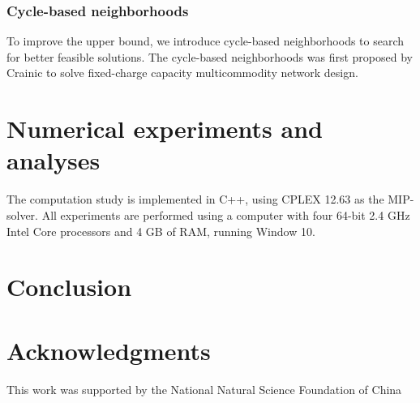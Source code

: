 \documentclass[11pt,nonblindrev,fleqn]{article}
\begin{document}
\subsubsection{Cycle-based neighborhoods}
To improve the upper bound, we introduce cycle-based neighborhoods to search for better feasible solutions. The cycle-based neighborhoods was first proposed by Crainic to solve fixed-charge capacity multicommodity network design. 

\section{Numerical experiments and analyses}
The computation study is implemented in C++, using CPLEX 12.63 as the MIP-solver. All experiments are performed using a computer with four 64-bit 2.4 GHz Intel Core processors and 4 GB of RAM, running Window 10.

\section{Conclusion}

\section*{Acknowledgments}

This work was supported by the National Natural Science Foundation of China
\end{document}
